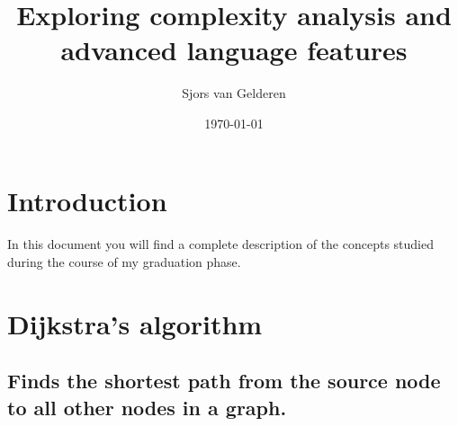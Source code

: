 \documentclass{article}
\author{Sjors van Gelderen}
\title{Exploring complexity analysis and advanced language features}
\date{\today{}}
\begin{document}
\maketitle{}

\tableofcontents{}

\section{Introduction}
\paragraph{}
In this document you will find a complete description of the concepts studied during the course of my graduation phase.

\section{Dijkstra's algorithm}
\subsection{
  Finds the shortest path from the source node to all other nodes in a graph.
}

\newpage{}
\end{document}
